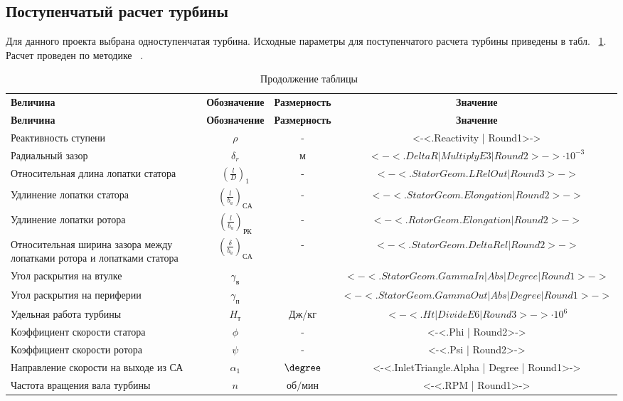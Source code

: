 \subsection{Поступенчатый расчет турбины}
Для данного проекта выбрана одноступенчатая турбина.
Исходные параметры для поступенчатого расчета турбины приведены в табл. ~\ref{turbine:midline_inlet}.
Расчет проведен по методике ~\cite{gtd_theory_text_book, mikhaltsev_1, mikhaltsev_2}.
\begin{center}
	\begin{longtable}{|p{4cm}|c|c|c|}
		\caption{Исходные параметры поступенчатого расчета турбины}
		\label{turbine:midline_inlet}
		\endfirsthead
		\caption*{\tabcapalign Продолжение таблицы~\thetable}\\[-0.45\onelineskip]
		\hline
		\textbf{Величина} & \textbf{Обозначение} & \textbf{Размерность} & \textbf{Значение} \\ \hline
		\endhead
		\hline
		\textbf{Величина} & \textbf{Обозначение} & \textbf{Размерность} & \textbf{Значение} \\ \hline
			Реактивность ступени & $\rho$ & - & <-<.Reactivity | Round1>->  \\ \hline
			Радиальный зазор & $\delta_r$ & м & $<-<.DeltaR | MultiplyE3 | Round2>-> \cdot 10^{-3}$ \\ \hline
			Относительная длина лопатки статора & $\left( \frac{l}{D} \right)_1$ & - & $<-<.StatorGeom.LRelOut | Round3>->$ \\ \hline
			Удлинение лопатки статора & $\left( \frac{l}{b_a} \right)_{СА}$ & - & $<-<.StatorGeom.Elongation | Round2>->$ \\ \hline
			Удлинение лопатки ротора & $\left( \frac{l}{b_a} \right)_{РК}$ & - & $<-<.RotorGeom.Elongation | Round2>->$ \\ \hline
			Относительная ширина зазора между лопатками ротора и лопатками статора & $\left( \frac{\delta}{b_a} \right)_{СА}$ & - & $<-<.StatorGeom.DeltaRel | Round2>->$ \\ \hline
			Угол раскрытия на втулке & $\gamma_{в}$ & \degree & $<-<.StatorGeom.GammaIn | Abs | Degree | Round1>->$ \\ \hline
			Угол раскрытия на периферии & $\gamma_{п}$ & \degree & $<-<.StatorGeom.GammaOut | Abs | Degree | Round1>->$ \\ \hline
			Удельная работа турбины & $H_т$ & Дж/кг & $<-<.Ht | DivideE6 | Round3>-> \cdot 10^6$ \\ \hline
			Коэффициент скорости статора & $\phi$ & - & <-<.Phi | Round2>-> \\ \hline
			Коэффициент скорости ротора & $\psi$ & - & <-<.Psi | Round2>-> \\ \hline
			Направление скорости на выходе из СА & $\alpha_1$ & $\degree$ & <-<.InletTriangle.Alpha | Degree | Round1>-> \\ \hline
			Частота вращения вала турбины & $n$ & $об/мин$ & <-<.RPM | Round1>-> \\ \hline
	\end{longtable}
\end{center}

